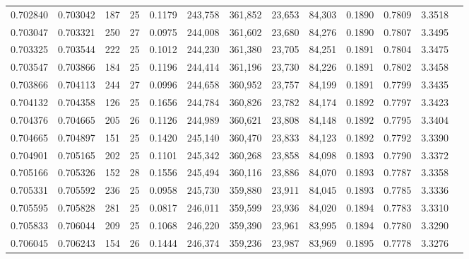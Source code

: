 \begin{tabular}{rrrrrrrrrrrrr}
0.702840 & 0.703042 &   187 &  25 &                                     0.1179 & 243,758 & 361,852 &  23,653 &  84,303 & 0.1890 & 0.7809 & 3.3518 \\
0.703047 & 0.703321 &   250 &  27 &                                     0.0975 & 244,008 & 361,602 &  23,680 &  84,276 & 0.1890 & 0.7807 & 3.3495 \\
0.703325 & 0.703544 &   222 &  25 &                                     0.1012 & 244,230 & 361,380 &  23,705 &  84,251 & 0.1891 & 0.7804 & 3.3475 \\
0.703547 & 0.703866 &   184 &  25 &                                     0.1196 & 244,414 & 361,196 &  23,730 &  84,226 & 0.1891 & 0.7802 & 3.3458 \\
0.703866 & 0.704113 &   244 &  27 &                                     0.0996 & 244,658 & 360,952 &  23,757 &  84,199 & 0.1891 & 0.7799 & 3.3435 \\
0.704132 & 0.704358 &   126 &  25 &                                     0.1656 & 244,784 & 360,826 &  23,782 &  84,174 & 0.1892 & 0.7797 & 3.3423 \\
0.704376 & 0.704665 &   205 &  26 &                                     0.1126 & 244,989 & 360,621 &  23,808 &  84,148 & 0.1892 & 0.7795 & 3.3404 \\
0.704665 & 0.704897 &   151 &  25 &                                     0.1420 & 245,140 & 360,470 &  23,833 &  84,123 & 0.1892 & 0.7792 & 3.3390 \\
0.704901 & 0.705165 &   202 &  25 &                                     0.1101 & 245,342 & 360,268 &  23,858 &  84,098 & 0.1893 & 0.7790 & 3.3372 \\
0.705166 & 0.705326 &   152 &  28 &                                     0.1556 & 245,494 & 360,116 &  23,886 &  84,070 & 0.1893 & 0.7787 & 3.3358 \\
0.705331 & 0.705592 &   236 &  25 &                                     0.0958 & 245,730 & 359,880 &  23,911 &  84,045 & 0.1893 & 0.7785 & 3.3336 \\
0.705595 & 0.705828 &   281 &  25 &                                     0.0817 & 246,011 & 359,599 &  23,936 &  84,020 & 0.1894 & 0.7783 & 3.3310 \\
0.705833 & 0.706044 &   209 &  25 &                                     0.1068 & 246,220 & 359,390 &  23,961 &  83,995 & 0.1894 & 0.7780 & 3.3290 \\
0.706045 & 0.706243 &   154 &  26 &                                     0.1444 & 246,374 & 359,236 &  23,987 &  83,969 & 0.1895 & 0.7778 & 3.3276 \\

\end{tabular}
